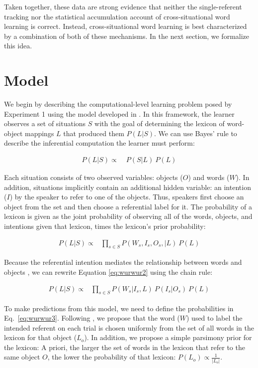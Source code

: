 \documentclass[man,floatsintext]{apa6}
\begin{document}
Taken together, these data are strong evidence that neither the single-referent tracking nor the statistical accumulation account of cross-situational word learning is correct. Instead, cross-situational word learning is best characterized by a combination of both of these mechanisms. In the next section, we formalize this idea.

\section{Model}

We begin by describing the computational-level learning problem posed by Experiment 1 using the model developed in . In this framework, the learner observes a set of situations $S$ with the goal of determining the lexicon of word-object mappings $L$ that produced them $P(L|S)$. We can use Bayes' rule to describe the inferential computation the learner must perform: 

\begin{align} 
P(L|S) \propto & \;P(S|L) \: P(L) \label{eq:wurwur1}
\end{align}

\noindent Each situation consists of two observed variables: objects ($O$) and words ($W$). In addition, situations implicitly contain an additional hidden variable: an intention ($I$) by the speaker to refer to one of the objects. Thus, speakers first choose an object from the set and then choose a referential label for it. The probability of a lexicon is given as the joint probability of observing all of the words, objects, and intentions given that lexicon, times the lexicon's prior probability:

\begin{align}
P(L|S) \propto & \prod\limits_{s\in{S}}P(W_{s},I_{s}, O_{s},|L) \: P(L) \label{eq:wurwur2}
\end{align}

\noindent Because the referential intention mediates the relationship between words and objects \cite{Frank2009a}, we can rewrite Equation \ref{eq:wurwur2} using the chain rule:

\begin{align}
P(L|S) \propto & \prod\limits_{s\in{S}}P(W_{s}| I_{s}, L) \: P(I_{s}|O_{s})  \: P(L) \label{eq:wurwur3}
\end{align}

To make predictions from this model, we need to define the probabilities in Eq.~\ref{eq:wurwur3}. Following , we propose that the word ($W$) used to label the intended referent on each trial is chosen uniformly from the set of all words in the lexicon for that object ($L_{o}$). In addition, we propose a simple parsimony prior for the lexicon: A priori, the larger the set of words in the lexicon that refer to the same object $O$, the lower the probability of that lexicon: $P(L_{o}) \propto \frac{1}{|L_{o}|}$. 
\end{document}
